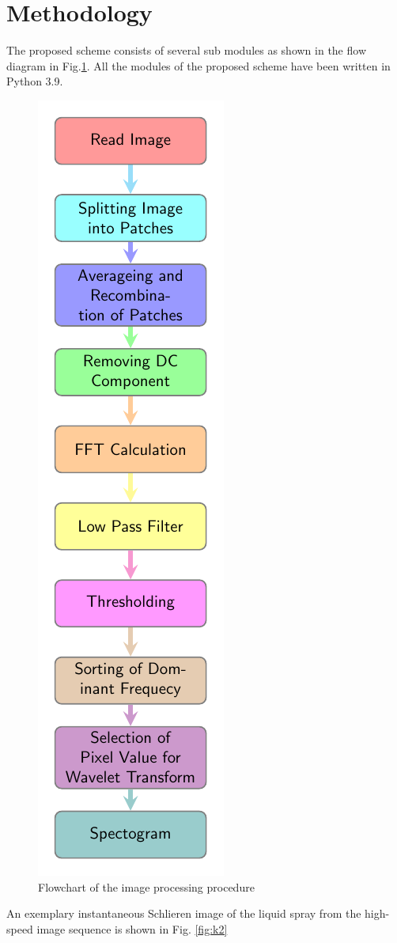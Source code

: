 \documentclass[conference]{IEEEtran}
\begin{document}
	
	\section*{Methodology}
	
	The proposed scheme consists of several sub modules as
	shown in the flow diagram in Fig.\ref{fig:k1}. All the modules of the
	proposed scheme have been written in Python 3.9.
	
	\begin{figure}[H]
		\centering
		\includegraphics[scale=1.11]{plot/meth.pdf}
		\caption{Flowchart of the image processing procedure}\label{fig:k1}
			\end{figure}
			An exemplary instantaneous Schlieren image of the
			liquid spray from the high-speed image sequence is shown
			in Fig. \ref{fig:k2} 
	
\end{document}
